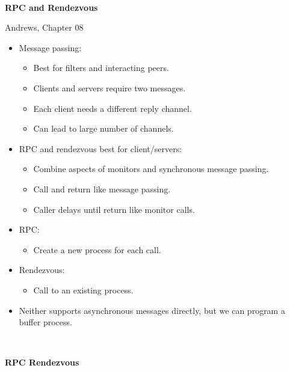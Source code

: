 \documentclass{article}
\newcommand{\bi}{\begin{itemize}}
\newcommand{\ii}{\item}
\newcommand{\ei}{\end{itemize}}
\newcommand{\ti}[1]{
\newpage
\mbox{~}

\vspace{1.25in}
\centerline{\bf #1}
}
\begin{document}
\huge\sf

\ti{RPC and Rendezvous}
\centerline{Andrews, Chapter 08}
\bi
\ii Message passing:
\bi
  \ii Best for filters and interacting peers.
  \ii Clients and servers require two messages.
  \ii Each client needs a different reply channel.
  \ii Can lead to large number of channels.
\ei
\ii RPC and rendezvous best for client/servers:
\bi
\ii Combine aspects of monitors and synchronous message passing.
\ii Call and return like message passing.
\ii Caller delays until return like monitor calls.
\ei
\ii RPC:
\bi
\ii Create a new process for each call.
\ei
\ii Rendezvous:
\bi
\ii Call to an existing process.
\ei
\ii Neither supports asynchronous  messages directly, but we can
program a buffer process. 
\ei

\ti{RPC \hspace{5in} Rendezvous}

\vspace{1cm}
\end{document}
